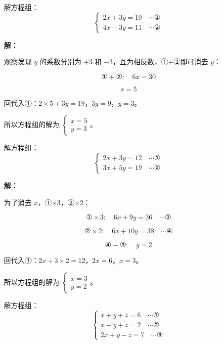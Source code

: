 \documentclass[12pt, a4paper]{ctexart}
\begin{document}
\bigskip

\begin{examplebox}[【例题3】用加减消元法解方程组]
解方程组：
$$\begin{cases} 2x + 3y = 19 \quad \cdots ① \\ 4x - 3y = 11 \quad \cdots ② \end{cases}$$
\end{examplebox}

\textbf{解：}

观察发现 $y$ 的系数分别为 $+3$ 和 $-3$，互为相反数，①$+$②即可消去 $y$：

$$① + ②: \quad 6x = 30$$

$$x = 5$$

回代入①：$2 \times 5 + 3y = 19$，$3y = 9$，$y = 3$。

所以方程组的解为 $\boxed{\begin{cases} x = 5 \\ y = 3 \end{cases}}$。

\bigskip

\begin{examplebox}
解方程组：
$$\begin{cases} 2x + 3y = 12 \quad \cdots ① \\ 3x + 5y = 19 \quad \cdots ② \end{cases}$$
\end{examplebox}

\textbf{解：}

为了消去 $x$，①$\times 3$，②$\times 2$：

$$① \times 3: \quad 6x + 9y = 36 \quad \cdots ③$$

$$② \times 2: \quad 6x + 10y = 38 \quad \cdots ④$$

$$④ - ③: \quad y = 2$$

回代入①：$2x + 3 \times 2 = 12$，$2x = 6$，$x = 3$。

所以方程组的解为 $\boxed{\begin{cases} x = 3 \\ y = 2 \end{cases}}$。

\bigskip

\begin{examplebox}[【例题5】三元一次方程组（拓展）]
解方程组：
$$\begin{cases} x + y + z = 6 \quad \cdots ① \\ x - y + z = 2 \quad \cdots ② \\ 2x + y - z = 7 \quad \cdots ③ \end{cases}$$
\end{examplebox}
\end{document}
